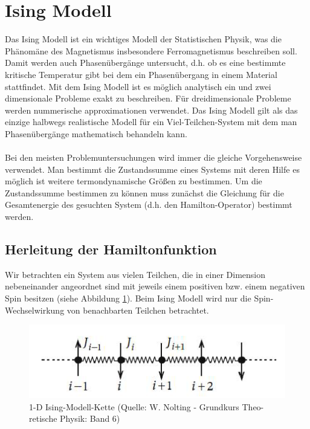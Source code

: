 
\usepackage{amsmath} 





\section*{Ising Modell}

Das Ising Modell ist ein wichtiges Modell der Statistischen Physik, was die Phänomäne des Magnetismus insbesondere Ferromagnetismus beschreiben soll. Damit werden auch Phasenübergänge untersucht, d.h. ob es eine bestimmte kritische Temperatur gibt bei dem ein Phasenübergang in einem Material stattfindet. Mit dem Ising Modell ist es möglich analytisch ein und zwei dimensionale Probleme exakt zu beschreiben. Für dreidimensionale Probleme werden nummerische approximationen verwendet. Das Ising Modell gilt als das einzige halbwegs realistische Modell für ein Viel-Teilchen-System mit dem man Phasenübergänge mathematisch behandeln kann.\\
\\
Bei den meisten Problemuntersuchungen wird immer die gleiche Vorgehensweise verwendet. Man bestimmt die Zustandssumme eines Systems mit deren Hilfe es möglich ist weitere termondynamische Größen zu bestimmen. Um die Zustandssumme bestimmen zu können muss zunächst die Gleichung für  die Gesamtenergie des gesuchten System (d.h. den Hamilton-Operator) bestimmt werden.

\subsection*{Herleitung der Hamiltonfunktion}

Wir betrachten ein System aus vielen Teilchen, die in einer Dimension nebeneinander angeordnet sind mit jeweils einem positiven bzw. einem negativen Spin besitzen (siehe Abbildung \ref{fig:1}). Beim Ising Modell wird nur die Spin-Wechselwirkung von benachbarten Teilchen betrachtet.


\begin{figure}
  \centering
  \includegraphics[scale=0.5]{./ising-pics/ising01.png}
  \caption{1-D Ising-Modell-Kette (Quelle: W. Nolting - Grundkurs Theo-
retische Physik: Band 6)
}
  \label{fig:1}
\end{figure}


